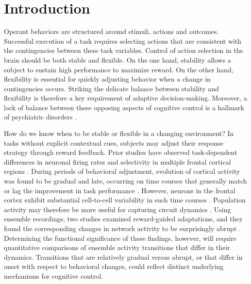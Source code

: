\section{Introduction}

Operant behaviors are structured around stimuli, actions and outcomes. Successful execution of a task requires selecting actions that are consistent with the contingencies between these task variables. Control of action selection in the brain should be both stable and flexible. On the one hand, stability allows a subject to sustain high performance to maximize reward. On the other hand, flexibility is essential for quickly adjusting behavior when a change in contingencies occurs. Striking the delicate balance between stability and flexibility is therefore a key requirement of adaptive decision-making. Moreover, a lack of balance between these opposing aspects of cognitive control is a hallmark of psychiatric disorders \citep{griffiths2014translational}.

How do we know when to be stable or flexible in a changing environment? In tasks without explicit contextual cues, subjects may adjust their response strategy through reward feedback. Prior studies have observed task-dependent differences in neuronal firing rates and selectivity in multiple frontal cortical regions \citep{asaad2000task,rich2009rat,rodgers2014neural}. During periods of behavioral adjustment, evolution of cortical activity was found to be gradual and late, occurring on time courses that generally match or lag the improvement in task performance \citep{mitz1991learning,chen1995neuronal,pasupathy2005different,antzoulatos2011differences}. However, neurons in the frontal cortex exhibit substantial cell-to-cell variability in such time courses \citep{mitz1991learning}. Population activity may therefore be more useful for capturing circuit dynamics \citep{mante2013context,stokes2013dynamic,wills2005attractor}. Using ensemble recordings, two studies examined reward-guided adaptations, and they found the corresponding changes in network activity to be surprisingly abrupt \citep{durstewitz2010abrupt,karlsson2012network}. Determining the functional significance of these findings, however, will require quantitative comparisons of ensemble activity transitions that differ in their dynamics. Transitions that are relatively gradual versus abrupt, or that differ in onset with respect to behavioral changes, could reflect distinct underlying mechanisms for cognitive control.

